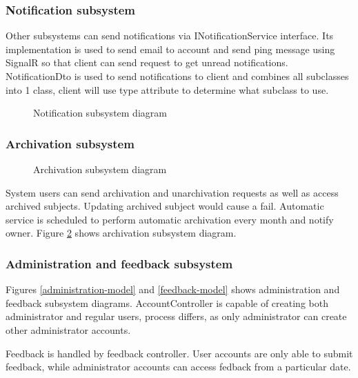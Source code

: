 \documentclass[
    english, %
]{VUMIFPSkursinis}
\begin{document}
\subsubsection{Notification subsystem}

Other subsystems can send notifications via INotificationService interface. Its implementation is used to send email to account and send ping message using SignalR so that client can send request to get unread notifications. NotificationDto is used to send notifications to client and combines all subclasses into 1 class, client will use type attribute to determine what subclass to use.

\begin{figure}[ht]
    \centering
    
    \label{notification-model}
    \caption{Notification subsystem diagram}
\end{figure}

\subsubsection{Archivation subsystem}

\begin{figure}[ht]
    \centering
    
    \caption{Archivation subsystem diagram}
    \label{archivation-model}
\end{figure}

System users can send archivation and unarchivation requests as well as access archived subjects. Updating archived subject would cause a fail. Automatic service is scheduled to perform automatic archivation every month and notify owner. Figure \ref{archivation-model} shows archivation subsystem diagram.

\subsubsection{Administration and feedback subsystem}

Figures \ref{administration-model} and \ref{feedback-model} shows administration and feedback subsystem diagrams. AccountController is capable of creating both administrator and regular users, process differs, as only administrator can create other administrator accounts.

Feedback is handled by feedback controller. User accounts are only able to submit feedback, while administrator accounts can access fedback from a particular date.
\end{document}
